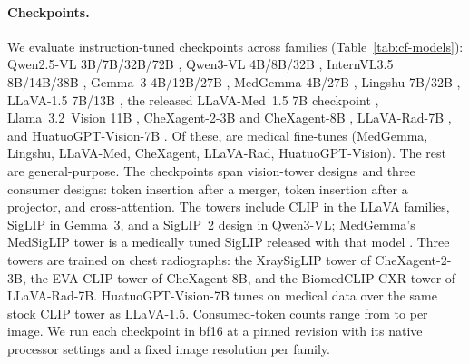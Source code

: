 \documentclass{article}
\begin{document}
\paragraph{Checkpoints.}
We evaluate \cfCheckpoints{} instruction-tuned checkpoints across \cfFamiliesWord{} families (Table~\ref{tab:cf-models}): Qwen2.5-VL 3B/7B/32B/72B \citep{bai2025qwen25vl}, Qwen3-VL 4B/8B/32B \citep{qwen2025qwen3vl}, InternVL3.5 8B/14B/38B \citep{wang2025internvl35}, Gemma~3 4B/12B/27B \citep{gemma2025gemma3}, MedGemma 4B/27B \citep{sellergren2025medgemma}, Lingshu 7B/32B \citep{lasa2025lingshu}, LLaVA-1.5 7B/13B \citep{liu2024improved}, the released LLaVA-Med~1.5 7B checkpoint \citep{li2023llavamed}, Llama~3.2~Vision 11B \citep{meta2024llama32vision}, CheXagent-2-3B and CheXagent-8B \citep{chen2024chexagent}, LLaVA-Rad-7B \citep{zambranochaves2025llavarad}, and HuatuoGPT-Vision-7B \citep{chen2024huatuogptvision}. Of these, \cfMedicalFamiliesWord{} are medical fine-tunes (MedGemma, Lingshu, LLaVA-Med, CheXagent, LLaVA-Rad, HuatuoGPT-Vision). The rest are general-purpose. The checkpoints span \cfTowerDesignsWord{} vision-tower designs and three consumer designs: token insertion after a merger, token insertion after a projector, and cross-attention. The towers include CLIP \citep{radford2021clip} in the LLaVA families, SigLIP \citep{zhai2023siglip} in Gemma~3, and a SigLIP~2 design \citep{tschannen2025siglip2} in Qwen3-VL; MedGemma's MedSigLIP tower is a medically tuned SigLIP released with that model \citep{sellergren2025medgemma}. Three towers are trained on chest radiographs: the XraySigLIP tower of CheXagent-2-3B, the EVA-CLIP tower of CheXagent-8B, and the BiomedCLIP-CXR tower of LLaVA-Rad-7B. HuatuoGPT-Vision-7B tunes on medical data over the same stock CLIP tower as LLaVA-1.5. Consumed-token counts range from \cfTokensMin{} to \cfTokensMax{} per image. We run each checkpoint in bf16 at a pinned revision with its native processor settings and a fixed image resolution per family.
\end{document}
